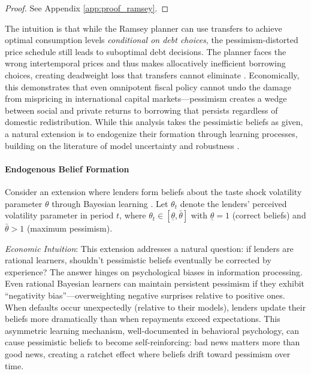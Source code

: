 \documentclass[12pt]{article}
\theoremstyle{plain}
\begin{document}
\begin{proof}
	See Appendix \ref{app:proof_ramsey}.
\end{proof}
The intuition is that while the Ramsey planner can use transfers to achieve
optimal consumption levels \textit{conditional on debt choices}, the
pessimism-distorted price schedule still leads to suboptimal debt decisions.
The planner faces the wrong intertemporal prices and thus makes allocatively
inefficient borrowing choices, creating deadweight loss that transfers cannot
eliminate \citep{AiyagariMarcetSargentSeppala2002}. Economically, this demonstrates that even omnipotent fiscal policy cannot undo the damage from mispricing in international capital markets---pessimism creates a wedge between social and private returns to borrowing that persists regardless of domestic redistribution. While this analysis takes the pessimistic beliefs as given, a natural extension is to endogenize their formation through learning processes, building on the literature of model uncertainty and robustness \citep{HansenSargent2001}.

\paragraph{Endogenous Belief Formation}

Consider an extension where lenders form beliefs about the taste shock
volatility parameter $\theta$ through Bayesian learning
\citep{CogleySargent2008}. Let $\theta_t$ denote the lenders' perceived
volatility parameter in period $t$, where $\theta_t \in [\underline{\theta},
		\bar{\theta}]$ with $\underline{\theta} = 1$ (correct beliefs) and
$\bar{\theta} > 1$ (maximum pessimism).

\textit{Economic Intuition}: This extension addresses a natural question: if lenders are rational learners, shouldn't pessimistic beliefs eventually be corrected by experience? The answer hinges on psychological biases in information processing. Even rational Bayesian learners can maintain persistent pessimism if they exhibit ``negativity bias''---overweighting negative surprises relative to positive ones. When defaults occur unexpectedly (relative to their models), lenders update their beliefs more dramatically than when repayments exceed expectations. This asymmetric learning mechanism, well-documented in behavioral psychology, can cause pessimistic beliefs to become self-reinforcing: bad news matters more than good news, creating a ratchet effect where beliefs drift toward pessimism over time.
\end{document}
